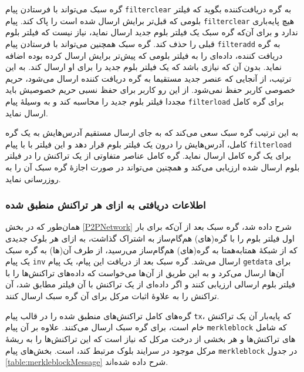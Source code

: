 گره سبک می‌تواند با فرستادن پیام \texttt{filterclear} به گره دریافت‌کننده بگوید که فیلتر بلومی که قبل‌تر برایش ارسال شده است را پاک کند. پیام \texttt{filterclear} هیچ پایه‌باری ندارد و برای آن‌که گره سبک یک فیلتر بلوم جدید ارسال نماید، نیاز نیست که فیلتر بلوم قبلی را حذف کند. گره سبک همچنین می‌تواند با فرستادن پیام \texttt{filteradd} به گره دریافت کننده، داده‌ای را به فیلتر بلومی که پیش‌تر برایش ارسال کرده بوده اضافه نماید. بدون آن که نیازی باشد که یک فیلتر بلوم جدید را برای او ارسال کند. به ‌این ترتیب،‌ از آنجایی که عنصر جدید مستقیما به گره دریافت کننده ارسال می‌شود، حریم خصوصی کاربر حفظ نمی‌شود. از این رو کاربر برای حفظ نسبی حریم خصوصیش باید مجددا فیلتر بلوم جدید را محاسبه کند و به وسیلهٔ پیام \texttt{filterload} برای گره کامل ارسال نماید.


به این ترتیب گره سبک سعی می‌کند که به جای ارسال مستقیم آدرس‌هایش به یک گره کامل، آدرس‌هایش را درون یک فیلتر بلوم قرار دهد و این فیلتر با با پیام \texttt{filterload} برای یک گره کامل ارسال نماید. گره کامل عناصر متفاوتی از یک تراکنش را در فیلتر بلوم ارسال شده ارزیابی می‌کند و همچنین می‌تواند در صورت اجازهٔ گره سبک آن را به روزرسانی نماید.

\subsubsection{اطلاعات دریافتی به ازای هر تراکنش منطبق شده}
همان‌طور که در بخش \ref{P2PNetwork} شرح داده شد، گره سبک بعد از آن‌که برای بار اول فیلتر بلوم را با گره(های) هم‌گام‌ساز به اشتراک گذاشت، به ازای هر بلوک جدیدی که از شبکهٔ همتا‌به‌همتا به گره(های) هم‌گام‌ساز می‌رسید، از طرف آن‌(ها) به گره سبک یک پیام \texttt{inv} ارسال می‌شد. گره سبک بعد از دریافت این پیام، یک پیام \texttt{getdata} برای آن‌ها ارسال می‌کرد و به این طریق از آن‌ها می‌خواست که داده‌های تراکنش‌ها را با فیلتر بلوم ارسالی ارزیابی کنند و اگر داده‌ای از یک تراکنش با آن فیلتر مطابق شد، آن تراکنش را به علاوهٔ اثبات مرکل برای آن گره سبک ارسال کنند.

گره‌های کامل تراکنش‌های منطبق شده را در قالب پیام \texttt{tx}، که پایه‌بار آن یک تراکنش خام است، برای گره سبک ارسال می‌کنند. علاوه بر آن پیام \texttt{merkleblock} که شامل های تراکنش‌ها و هر بخشی از درخت مرکل که نیاز است که این تراکنش‌ها را به ریشهٔ مرکل موجود در سرایند بلوک مرتبط کند، است. بخش‌های پیام \texttt{merkleblock} در جدول  \ref{table:merkleblockMessage} شرح داده شده‌اند.

